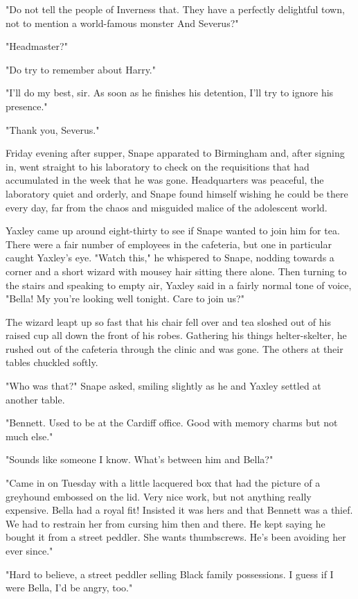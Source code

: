 "Do not tell the people of Inverness that. They have a perfectly delightful town, not to mention a world-famous monster{\el} And Severus{\el}?"

"Headmaster?"

"Do try to remember about Harry."

"I'll do my best, sir. As soon as he finishes his detention, I'll try to ignore his presence."

"Thank you, Severus."

Friday evening after supper, Snape apparated to Birmingham and, after signing in, went straight to his laboratory to check on the requisitions that had accumulated in the week that he was gone. Headquarters was peaceful, the laboratory quiet and orderly, and Snape found himself wishing he could be there every day, far from the chaos and misguided malice of the adolescent world.

Yaxley came up around eight-thirty to see if Snape wanted to join him for tea. There were a fair number of employees in the cafeteria, but one in particular caught Yaxley's eye. "Watch this," he whispered to Snape, nodding towards a corner and a short wizard with mousey hair sitting there alone. Then turning to the stairs and speaking to empty air, Yaxley said in a fairly normal tone of voice, "Bella! My you're looking well tonight. Care to join us?"

The wizard leapt up so fast that his chair fell over and tea sloshed out of his raised cup all down the front of his robes. Gathering his things helter-skelter, he rushed out of the cafeteria through the clinic and was gone. The others at their tables chuckled softly.

"Who was that?" Snape asked, smiling slightly as he and Yaxley settled at another table.

"Bennett. Used to be at the Cardiff office. Good with memory charms but not much else."

"Sounds like someone I know. What's between him and Bella?"

"Came in on Tuesday with a little lacquered box that had the picture of a greyhound embossed on the lid. Very nice work, but not anything really expensive. Bella had a royal fit! Insisted it was hers and that Bennett was a thief. We had to restrain her from cursing him then and there. He kept saying he bought it from a street peddler. She wants thumbscrews. He's been avoiding her ever since."

"Hard to believe, a street peddler selling Black family possessions. I guess if I were Bella, I'd be angry, too."

